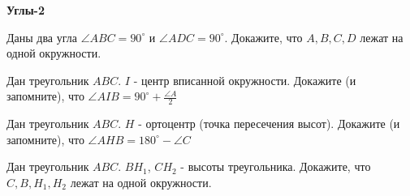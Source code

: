 \documentclass{article}
\begin{document}
    \begin{center}
        \textbf{Углы-2}
    \end{center}

    \begin{enumerate_boxed}

        \item Даны два угла $\angle ABC = 90^\circ$ и $\angle ADC = 90^\circ$.
        Докажите, что $A, B, C, D$ лежат на одной окружности.

        \item Дан треугольник $ABC$. $I$ - центр вписанной окружности.
        Докажите (и запомните), что $\angle AIB = 90^\circ + \frac{\angle A}{2}$

        \item Дан треугольник $ABC$. $H$ - ортоцентр (точка пересечения высот).
        Докажите (и запомните), что $\angle AHB = 180^\circ - \angle C$

        \item Дан треугольник $ABC$. $BH_1$, $CH_2$ - высоты треугольника.
        Докажите, что $C,B,H_1, H_2$ лежат на одной окружности.

    \end{enumerate_boxed}
\end{document}
